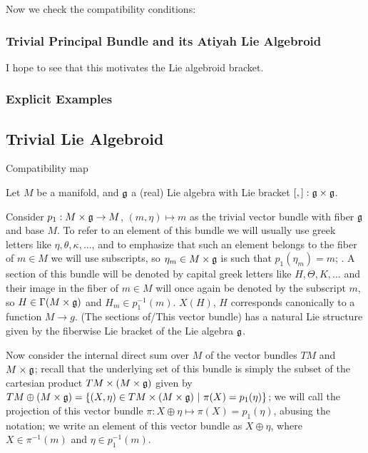 Now we check the compatibility conditions:

\subsubsection{Trivial Principal Bundle and its Atiyah Lie Algebroid}

I hope to see that this motivates the Lie algebroid bracket.

\subsubsection{Explicit Examples}


\subsection{Trivial Lie Algebroid}

Compatibility map

Let $M$ be a manifold, and $\mathfrak{g}$ a (real) Lie algebra with Lie bracket $[,]: \mathfrak{g} \times \mathfrak{g}$. 

Consider $p_1: M \times \mathfrak{g} \to M$, $(m, \eta) \mapsto m$ as the trivial vector bundle with fiber $\mathfrak{g}$ and base $M$. To refer to an element of this bundle we will usually use greek letters like $\eta, \theta, \kappa, \dots$, and to emphasize that such an element belongs to the fiber of $m \in M$ we will use subscripts, so $\eta_m \in M \times \mathfrak{g}$ is such that $p_1(\eta_m) = m$; . A section of this bundle will be denoted by capital greek letters like $H, \Theta, K, \dots$ and their image in the fiber of $m \in M$ will once again be denoted by the subscript $m$, so $H \in \Gamma(M \times \mathfrak{g})$ and $H_m \in p_1^{-1}(m)$. $X(H)$, $H$ corresponds canonically to a function $M \to g$. (The sections of/This vector bundle) has a natural Lie structure given by the fiberwise Lie bracket of the Lie algebra $\mathfrak{g}$.

Now consider the internal direct sum over $M$ of the vector bundles $TM$ and $M \times \mathfrak{g}$; recall  that the underlying set of this bundle is simply the subset of the cartesian product $TM \times (M \times \mathfrak{g})$ given by $TM \oplus (M \times \mathfrak{g}) = \{(X, \eta) \in TM \times (M \times \mathfrak{g}) \operatorname{\,|\,} \pi(X) = p_1(\eta)\}$; we will call the projection of this vector bundle $\pi: X \oplus \eta \mapsto \pi(X) = p_1(\eta)$, abusing the notation; we write an element of this vector bundle as $X \oplus \eta$, where $X \in \pi^{-1}(m)$ and $\eta \in p_1^{-1}(m)$.

